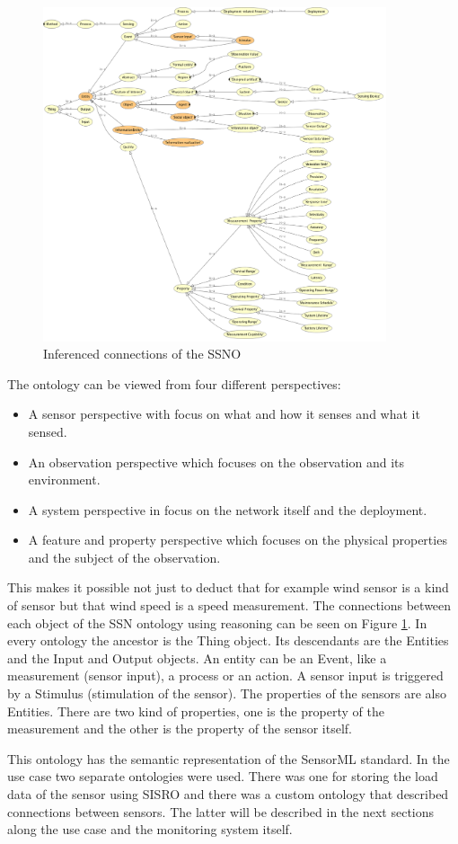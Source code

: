 \begin{figure}[h]
	\centering
	\includegraphics[width=0.9\textwidth]{figures/ssno-infer.png}
	\caption{Inferenced connections of the SSNO\label{fig:ssninfer}}
\end{figure}

The ontology can be viewed from four different perspectives:
\begin{itemize}
\item A sensor perspective with focus on what and how it senses and what it sensed.
\item An observation perspective which focuses on the observation and its environment.
\item A system perspective in focus on the network itself and the deployment.
\item A feature and property perspective which focuses on the physical properties and the subject of the observation. 
\end{itemize}
This makes it possible not just to deduct that for example wind sensor is a kind of sensor but that wind speed is a speed measurement. The connections between each object of the SSN ontology using reasoning can be seen on Figure \ref{fig:ssninfer}. 
In every ontology the ancestor is the Thing object. Its descendants are the Entities and the Input and Output objects. An entity can be an Event, like a measurement (sensor input), a process or an action. A sensor input is triggered by a Stimulus (stimulation of the sensor). The properties of the sensors are also Entities. There are two kind of properties, one is the property of the measurement and the other is the property of the sensor itself. 

This ontology has the semantic representation of the SensorML standard. In the use case two separate ontologies were used. There was one for storing the load data of the sensor using SISRO and there was a custom ontology that described connections between sensors. The latter will be described in the next sections along the use case and the monitoring system itself.